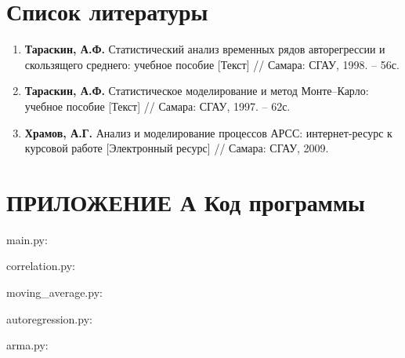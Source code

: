 \documentclass[12pt, fleqn]{article}
\begin{document}
\newpage
{}
{}
\section*{Список литературы}
{
	\begin{enumerate}
		\item {\textbf{Тараскин, А.Ф.} Статистический анализ временных рядов авторегрессии и скользящего среднего: учебное пособие [Текст] // Самара: СГАУ, 1998. – 56с.}
		\item {\textbf{Тараскин, А.Ф.} Статистическое моделирование и метод Монте–Карло: учебное пособие [Текст] // Самара: СГАУ, 1997. – 62с.}
		\item {\textbf{Храмов, А.Г.} Анализ и моделирование процессов АРСС: интернет-ресурс к курсовой работе [Электронный ресурс] // Самара: СГАУ, 2009.}
	\end{enumerate}
}
			
			  
			  
			  
\newpage
{}
{}
\section*{ПРИЛОЖЕНИЕ А Код программы}
main.py:

			    
\newpage
correlation.py:

			    
\newpage 
moving\_average.py:

				
\newpage
autoregression.py:

				
\newpage 
arma.py:

			
			
\newpage
{}
{}
\end{document}
